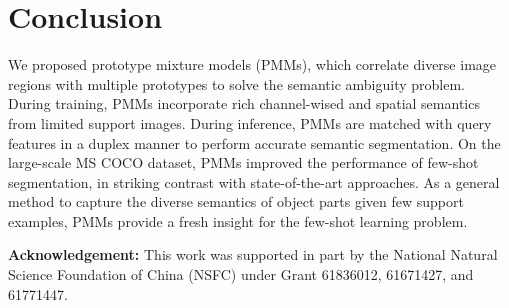 \documentclass[runningheads]{llncs}
\begin{document}
\section{Conclusion}
We proposed prototype mixture models (PMMs), which correlate diverse image regions with multiple prototypes to solve the semantic ambiguity problem. During training, PMMs incorporate rich channel-wised and spatial semantics from limited support images. During inference, PMMs are matched with query features in a duplex manner to perform accurate semantic segmentation. On the large-scale MS COCO dataset, PMMs improved the performance of few-shot segmentation, in striking contrast with state-of-the-art approaches. As a general method to capture the diverse semantics of object parts given few support examples, PMMs provide a fresh insight for the few-shot learning problem.

\textbf{Acknowledgement:} This work was supported in part by the National Natural Science Foundation of China (NSFC) under Grant 61836012, 61671427, and 61771447. 

\clearpage



\end{document}
